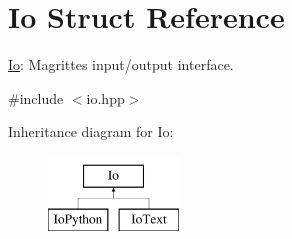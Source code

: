\hypertarget{structIo}{}\section{Io Struct Reference}
\label{structIo}


\mbox{\hyperlink{structIo}{Io}}\+: Magritte\textquotesingle{}s input/output interface.  




{\ttfamily \#include $<$io.\+hpp$>$}

Inheritance diagram for Io\+:\begin{figure}[H]
\begin{center}
\leavevmode
\includegraphics[height=2.000000cm]{structIo}
\end{center}
\end{figure}
